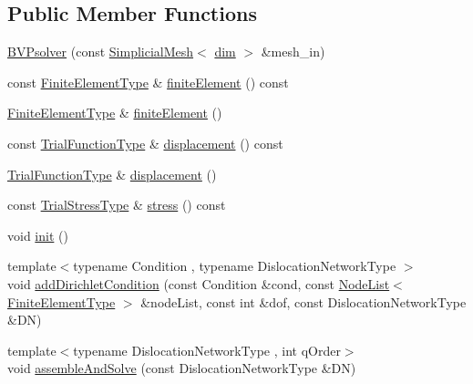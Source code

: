 \subsection*{Public Member Functions}
\begin{DoxyCompactItemize}
\item 
\hyperlink{classmodel_1_1_b_v_psolver_a09ebfa60effe34b55d77597bbba97ccd}{B\+V\+Psolver} (const \hyperlink{classmodel_1_1_simplicial_mesh}{Simplicial\+Mesh}$<$ \hyperlink{plot_nd_a_8m_a382f3ca768b275b8d563604f7fc7df73}{dim} $>$ \&mesh\+\_\+in)
\item 
const \hyperlink{classmodel_1_1_b_v_psolver_a010425e48ff247a2d8203f4625b29ea1}{Finite\+Element\+Type} \& \hyperlink{classmodel_1_1_b_v_psolver_acade72ec04ff06bd37f0a0748da4ae6f}{finite\+Element} () const 
\item 
\hyperlink{classmodel_1_1_b_v_psolver_a010425e48ff247a2d8203f4625b29ea1}{Finite\+Element\+Type} \& \hyperlink{classmodel_1_1_b_v_psolver_a634b48927c3b74c8c1bdd00d816211f0}{finite\+Element} ()
\item 
const \hyperlink{classmodel_1_1_b_v_psolver_a931b55260404ec986f534d8aafc20a68}{Trial\+Function\+Type} \& \hyperlink{classmodel_1_1_b_v_psolver_aa06e5b935fb38e9f0ab4155d2a863127}{displacement} () const 
\item 
\hyperlink{classmodel_1_1_b_v_psolver_a931b55260404ec986f534d8aafc20a68}{Trial\+Function\+Type} \& \hyperlink{classmodel_1_1_b_v_psolver_a9473e92270d446d822415e422784513c}{displacement} ()
\item 
const \hyperlink{classmodel_1_1_b_v_psolver_a6bc66eb0f47862bcb00b530cf9b85601}{Trial\+Stress\+Type} \& \hyperlink{classmodel_1_1_b_v_psolver_a1d5802784b6103c8e16057fa17800245}{stress} () const 
\item 
void \hyperlink{classmodel_1_1_b_v_psolver_a92c8279f8ef6f709892f1c1ee9b5e58a}{init} ()
\item 
{\footnotesize template$<$typename Condition , typename Dislocation\+Network\+Type $>$ }\\void \hyperlink{classmodel_1_1_b_v_psolver_a4508fa1b81eb253c2b5d3ae75b186b7a}{add\+Dirichlet\+Condition} (const Condition \&cond, const \hyperlink{structmodel_1_1_node_list}{Node\+List}$<$ \hyperlink{classmodel_1_1_b_v_psolver_a010425e48ff247a2d8203f4625b29ea1}{Finite\+Element\+Type} $>$ \&node\+List, const int \&dof, const Dislocation\+Network\+Type \&D\+N)
\item 
{\footnotesize template$<$typename Dislocation\+Network\+Type , int q\+Order$>$ }\\void \hyperlink{classmodel_1_1_b_v_psolver_aaa41602fcebef30cb3aaeadec004c002}{assemble\+And\+Solve} (const Dislocation\+Network\+Type \&D\+N)

\end{DoxyCompactItemize}
